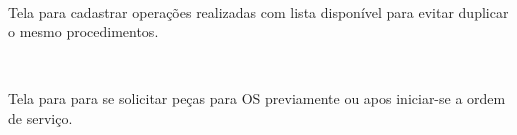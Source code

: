 \begin{figure}[htb]
	\centering
	\mbox{%
		\qquad
	}
	
\end{figure}
\newpage
Tela para cadastrar operações realizadas com lista disponível para evitar duplicar o mesmo procedimentos.

\begin{figure}[htb]
	\centering
	\mbox{%
		\qquad
	}
	
\end{figure}
\newpage
Tela para para se solicitar peças para OS previamente ou apos iniciar-se a ordem de serviço. 

